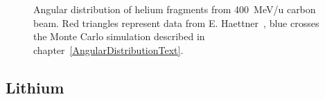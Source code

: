 \begin{figure}[!ht]
{\label{fig:D_34.7_2_N}
}
\label{fig:subfigureExample}
\caption[Optional caption for list of figures]{Angular distribution of helium fragments from 400~MeV/u carbon beam. Red triangles represent data from E. Haettner~\cite{ehaettner}, blue crosses the Monte Carlo simulation described in chapter~\ref{AngularDistributionText}.}
\end{figure}
\clearpage
\subsection{Lithium}
\begin{figure}[!ht]
\centering
{}
\end{figure}
